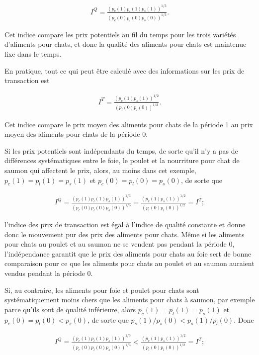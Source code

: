 \documentclass[]{article}
\begin{document}
\begin{align*}
I^{Q} = \frac{(p_{c}(1)p_{l}(1)p_{s}(1))^{1/3}}{(p_{c}(0)p_{ l}(0)p_{s}(0))^{1/3}}.
\end{align*}

Cet indice compare les prix potentiels au fil du temps pour les trois variétés d'aliments pour chats, et donc la qualité des aliments pour chats est maintenue fixe dans le temps.

En pratique, tout ce qui peut être calculé avec des informations sur les prix de transaction est

\begin{align*}
I^{T} = \frac{(p_{c}(1)p_{s}(1))^{1/2}}{(p_{l}(0)p_{l}(0))^{1/2}}.
\end{align*}

Cet indice compare le prix moyen des aliments pour chats de la période 1 au prix moyen des aliments pour chats de la période 0.

Si les prix potentiels sont indépendants du temps, de sorte qu'il n'y a pas de différences systématiques entre le foie, le poulet et la nourriture pour chat de saumon qui affectent le prix, alors, au moins dans cet exemple, \(p_{c}(1)= p_{l}(1) = p_{s}(1)\) et \(p_{c}(0)= p_{l}(0)= p_{s}(0)\), de sorte que

\begin{align*}
I^{Q} = \frac{(p_{c}(1)p_{l}(1)p_{s}(1))^{1/3}}{(p_{c}(0)p_{ l}(0)p_{s}(0))^{1/3}} = \frac{(p_{c}(1)p_{s}(1))^{1/2}}{(p_{l}(0)p_{l}(0))^{1/2}} = I^{T};
\end{align*}

l'indice des prix de transaction est égal à l'indice de qualité constante et donne donc le mouvement pur des prix des aliments pour chats. Même si les aliments pour chats au poulet et au saumon ne se vendent pas pendant la période 0, l'indépendance garantit que le prix des aliments pour chats au foie sert de bonne comparaison pour ce que les aliments pour chats au poulet et au saumon auraient vendus pendant la période 0.

Si, au contraire, les aliments pour foie et poulet pour chats sont systématiquement moins chers que les aliments pour chats à saumon, par exemple parce qu'ils sont de qualité inférieure, alors \(p_{c}(1)= p_{l}(1)= p_{s}(1)\) et \(p_{c}(0)= p_{l}(0)<p_{s}(0)\), de sorte que \(p_{s}(1)/ p_{s}(0)<p_{s }(1)/ p_{l}(0)\). Donc

\begin{align*}
I^{Q} = \frac{(p_{c}(1)p_{l}(1)p_{s}(1))^{1/3}}{(p_{c}(0)p_{ l}(0)p_{s}(0))^{1/3}} <\frac{(p_{c}(1)p_{s}(1))^{1/2}}{(p_{l}(0)p_{l}(0))^{1/2}} = I^{T};
\end{align*}
\end{document}
